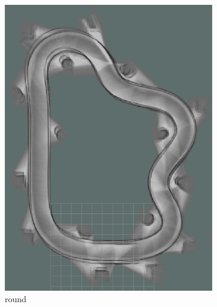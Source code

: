 \begin{figure}
\begin{subfigure}{.3\linewidth}
		\includegraphics[width=\textwidth]{Pictures/2slamtest2}
		\caption{ round}
	\end{subfigure}
	\begin{subfigure}{.3\linewidth}

\end{subfigure}
\end{figure}

